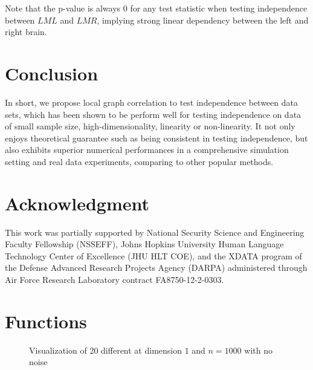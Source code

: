 \documentclass[11pt]{article}
\begin{document}
Note that the p-value is always $0$ for any test statistic when testing independence between $LML$ and $LMR$, implying strong linear dependency between the left and right brain.

\section{Conclusion}
\label{conclu}
In short, we propose local graph correlation to test independence between data sets, which has been shown to be perform well for testing independence on data of small sample size, high-dimensionality, linearity or non-linearity. It not only enjoys theoretical guarantee such as being consistent in testing independence, but also exhibits superior numerical performances in a comprehensive simulation setting and real data experiments, comparing to other popular methods.

\section*{Acknowledgment}
This work was partially supported by National Security Science and Engineering Faculty Fellowship (NSSEFF),
 Johns Hopkins University Human Language Technology Center of Excellence (JHU HLT COE), and the
 XDATA program of the Defense Advanced Research Projects Agency (DARPA) administered through Air Force Research Laboratory contract FA8750-12-2-0303.


\appendix

\section{Functions}

\begin{figure}[htbp]
\caption{Visualization of 20 different at dimension $1$ and $n=1000$ with no noise}
\label{fig0}
\end{figure}
\end{document}
